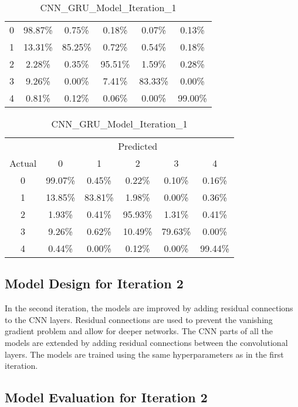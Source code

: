 \begin{table}[ht]
\begin{minipage}{0.32\textwidth}
\begin{tabular}{cccccc}
            \midrule
            0 & 98.87\% & 0.75\% & 0.18\% & 0.07\% & 0.13\% \\
            1 & 13.31\% & 85.25\% & 0.72\% & 0.54\% & 0.18\% \\
            2 & 2.28\%  & 0.35\% & 95.51\% & 1.59\% & 0.28\% \\
            3 & 9.26\%  & 0.00\% & 7.41\%  & 83.33\% & 0.00\% \\
            4 & 0.81\%  & 0.12\% & 0.06\%  & 0.00\% & 99.00\% \\
            \bottomrule
        \end{tabular}
    \end{minipage}
    \hfill
    \begin{minipage}{0.32\textwidth}
        \centering
        \caption*{CNN\_GRU\_Model\_Iteration\_1}
        \begin{tabular}{cccccc}
            \toprule
            & \multicolumn{5}{c}{Predicted} \\
            \cmidrule(lr){2-6}
            Actual & 0 & 1 & 2 & 3 & 4 \\
            \midrule
            0 & 99.07\% & 0.45\% & 0.22\% & 0.10\% & 0.16\% \\
            1 & 13.85\% & 83.81\% & 1.98\% & 0.00\% & 0.36\% \\
            2 & 1.93\%  & 0.41\% & 95.93\% & 1.31\% & 0.41\% \\
            3 & 9.26\%  & 0.62\% & 10.49\% & 79.63\% & 0.00\% \\
            4 & 0.44\%  & 0.00\% & 0.12\% & 0.00\% & 99.44\% \\
            \bottomrule
        \end{tabular}
    \end{minipage}
\end{table}

\subsection{Model Design for Iteration 2}
In the second iteration, the models are improved by adding residual connections to the CNN layers. Residual connections are used to prevent the vanishing gradient problem and allow for deeper networks. The CNN parts of all the models are extended by adding residual connections between the convolutional layers. The models are trained using the same hyperparameters as in the first iteration. 

\subsection{Model Evaluation for Iteration 2}

